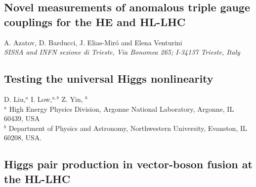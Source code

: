 \documentclass[../report.tex]{subfiles}
\providecommand{\main}{..}
\begin{document}




\subsection{Novel measurements of anomalous triple gauge couplings for the HE and HL-LHC} \label{sec:WZtrans}
\begin{center}
{A. Azatov, D. Barducci, J. Elias-Mir\'o and Elena Venturini}\\
 {\it \small
SISSA and INFN sezione di Trieste, Via Bonomea 265; I-34137 Trieste, Italy\\
 }
\end{center}




\subsection{Testing the universal Higgs nonlinearity}
% 
\label{sect-illus}
\begin{center}
 {D. Liu,$^a$   I. Low,$^{a,b} $ Z. Yin, $^b$\\
}
 {\small $^a$ High Energy Physics Division, Argonne National Laboratory, Argonne, IL 60439, USA \\
$^b$ Department of Physics and Astronomy, Northwestern University, Evanston, IL 60208, USA.}
\end{center}







\subsection{Higgs pair production in vector-boson fusion at the HL-LHC}\label{sec:VVHHcont}

\end{document}
